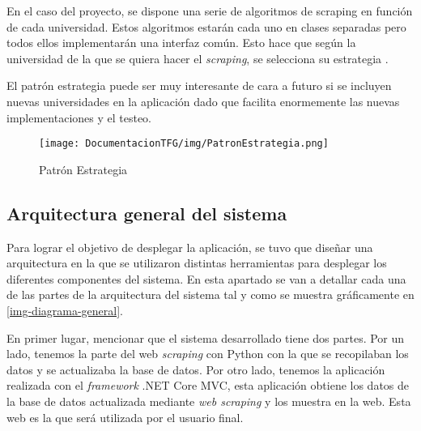 En el caso del proyecto, se dispone una serie de algoritmos de scraping en función de cada universidad. Estos algoritmos estarán cada uno en clases separadas pero todos ellos implementarán una interfaz común. Esto hace que según la universidad de la que se quiera hacer el \textit{scraping}, se selecciona su estrategia \cite{patronestrategia:latex}.

El patrón estrategia puede ser muy interesante de cara a futuro si se incluyen nuevas universidades en la aplicación dado que facilita enormemente las nuevas implementaciones y el testeo.
\begin{figure}[H]
    \centering
    \texttt{[image: DocumentacionTFG/img/PatronEstrategia.png]}
    \caption{Patrón Estrategia}
\end{figure}

\subsection{Arquitectura general del sistema}
Para lograr el objetivo de desplegar la aplicación, se tuvo que diseñar una arquitectura en la que se utilizaron distintas herramientas para desplegar los diferentes componentes del sistema. En esta apartado se van a detallar cada una de las partes de la arquitectura del sistema tal y como se muestra gráficamente en \ref{img-diagrama-general}.

En primer lugar, mencionar que el sistema desarrollado tiene dos partes. Por un lado, tenemos la parte del web \textit{scraping} con Python con la que se recopilaban los datos y se actualizaba la base de datos. Por otro lado, tenemos la aplicación realizada con el \textit{framework} .NET Core MVC, esta aplicación obtiene los datos de la base de datos actualizada mediante \textit{web scraping} y los muestra en la web. Esta web es la que será utilizada por el usuario final.

